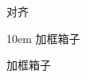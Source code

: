 \documentclass[twoside]{ctexart}
\begin{document}
            {\setlength{\fboxrule}{.3em} 
            \setlength{\fboxsep}{.7em} 
            }

            {\setlength{\fboxrule}{0.1pt}
            \setlength{\fboxsep}{0pt}


            对齐
            \begin{boxedminipage}[b][3em][t]{10em}
                加框箱子

                加框箱子
            \end{boxedminipage}
            }
\end{document}
